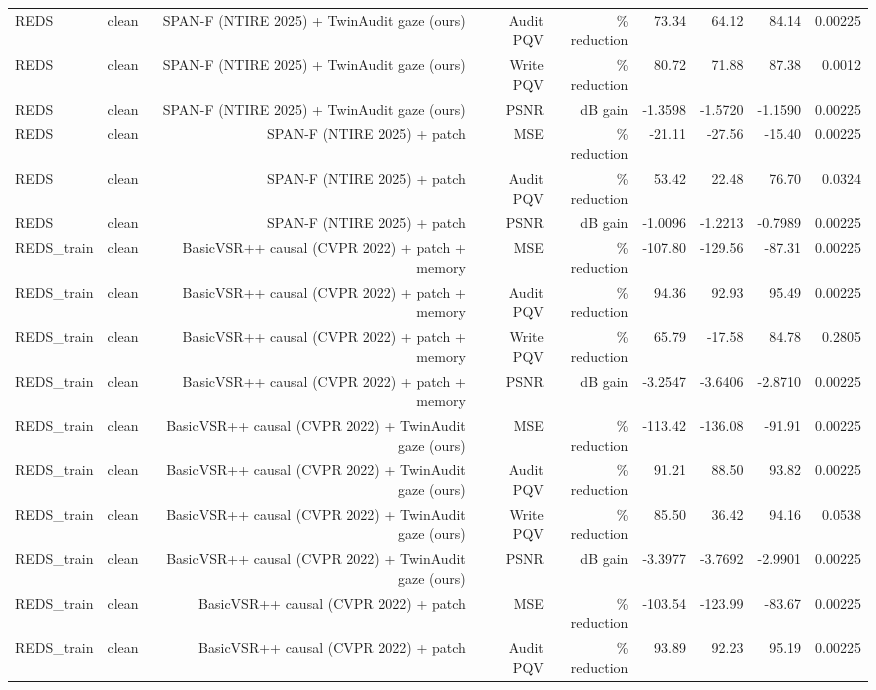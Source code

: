 \begin{table}[t]
\begin{tabular}{llrrrrrrr}
REDS & clean & SPAN-F (NTIRE 2025) + TwinAudit gaze (ours) & Audit PQV & \% reduction & 73.34 & 64.12 & 84.14 & 0.00225 \\
REDS & clean & SPAN-F (NTIRE 2025) + TwinAudit gaze (ours) & Write PQV & \% reduction & 80.72 & 71.88 & 87.38 & 0.0012 \\
REDS & clean & SPAN-F (NTIRE 2025) + TwinAudit gaze (ours) & PSNR & dB gain & -1.3598 & -1.5720 & -1.1590 & 0.00225 \\
REDS & clean & SPAN-F (NTIRE 2025) + patch & MSE & \% reduction & -21.11 & -27.56 & -15.40 & 0.00225 \\
REDS & clean & SPAN-F (NTIRE 2025) + patch & Audit PQV & \% reduction & 53.42 & 22.48 & 76.70 & 0.0324 \\
REDS & clean & SPAN-F (NTIRE 2025) + patch & PSNR & dB gain & -1.0096 & -1.2213 & -0.7989 & 0.00225 \\
REDS\_train & clean & BasicVSR++ causal (CVPR 2022) + patch + memory & MSE & \% reduction & -107.80 & -129.56 & -87.31 & 0.00225 \\
REDS\_train & clean & BasicVSR++ causal (CVPR 2022) + patch + memory & Audit PQV & \% reduction & 94.36 & 92.93 & 95.49 & 0.00225 \\
REDS\_train & clean & BasicVSR++ causal (CVPR 2022) + patch + memory & Write PQV & \% reduction & 65.79 & -17.58 & 84.78 & 0.2805 \\
REDS\_train & clean & BasicVSR++ causal (CVPR 2022) + patch + memory & PSNR & dB gain & -3.2547 & -3.6406 & -2.8710 & 0.00225 \\
REDS\_train & clean & BasicVSR++ causal (CVPR 2022) + TwinAudit gaze (ours) & MSE & \% reduction & -113.42 & -136.08 & -91.91 & 0.00225 \\
REDS\_train & clean & BasicVSR++ causal (CVPR 2022) + TwinAudit gaze (ours) & Audit PQV & \% reduction & 91.21 & 88.50 & 93.82 & 0.00225 \\
REDS\_train & clean & BasicVSR++ causal (CVPR 2022) + TwinAudit gaze (ours) & Write PQV & \% reduction & 85.50 & 36.42 & 94.16 & 0.0538 \\
REDS\_train & clean & BasicVSR++ causal (CVPR 2022) + TwinAudit gaze (ours) & PSNR & dB gain & -3.3977 & -3.7692 & -2.9901 & 0.00225 \\
REDS\_train & clean & BasicVSR++ causal (CVPR 2022) + patch & MSE & \% reduction & -103.54 & -123.99 & -83.67 & 0.00225 \\
REDS\_train & clean & BasicVSR++ causal (CVPR 2022) + patch & Audit PQV & \% reduction & 93.89 & 92.23 & 95.19 & 0.00225 \\

\end{tabular}
\end{table}
